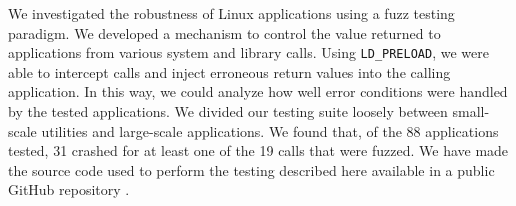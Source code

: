 We investigated the robustness of Linux applications using a fuzz testing paradigm. We developed a mechanism to control the value returned to applications from various system and library calls. Using \texttt{LD\_PRELOAD}, we were able to intercept calls and inject erroneous return values into the calling application. In this way, we could analyze how well error conditions were handled by the tested applications. We divided our testing suite loosely between small-scale utilities and large-scale applications. We found that, of the 88 applications tested, 31 crashed for at least one of the 19 calls that were fuzzed. We have made the source code used to perform the testing described here available in a public GitHub repository \cite{github}.